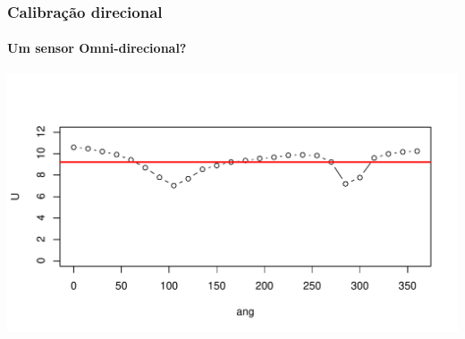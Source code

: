 \documentclass[12pt,handout]{beamer}
\begin{document}
\begin{frame}
  \frametitle{Calibração direcional}
  \framesubtitle{Um sensor Omni-direcional?}
  \centering
  \includegraphics[width=1\textwidth]{../../figures/dircal.pdf}
 
\end{frame}
\end{document}
